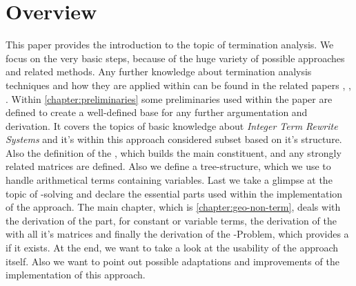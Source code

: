 \section{Overview}
\label{sec:overview}
This paper provides the introduction to the topic of termination analysis. We focus on the very basic steps, because of the huge variety of possible approaches and related methods. Any further knowledge about termination analysis techniques and how they are applied within \aprove can be found in the related papers \cite{giesl2017analyzing}, \cite{giesl2006aprove}, \cite{giesl2003aprove}.\newline
Within \autoref{chapter:preliminaries} some preliminaries used within the paper are defined to create a well-defined base for any further argumentation and derivation. It covers the topics of basic knowledge about \textit{Integer Term Rewrite Systems} and it's within this approach considered subset based on it's structure. Also the definition of the \gna, which builds the main constituent, and any strongly related matrices are defined. Also we define a tree-structure, which we use to handle arithmetical terms containing variables. Last we take a glimpse at the topic of -solving and declare the essential parts used within the implementation of the approach.\newline
The main chapter, which is \autoref{chapter:geo-non-term}, deals with the derivation of the \stem part, for constant or variable terms, the derivation of the \loopt with all it's matrices and finally the derivation of the -Problem, which provides a \gna if it exists. \newline
At the end, we want to take a look at the usability of the approach itself. Also we want to point out possible adaptations and improvements of the implementation of this approach.